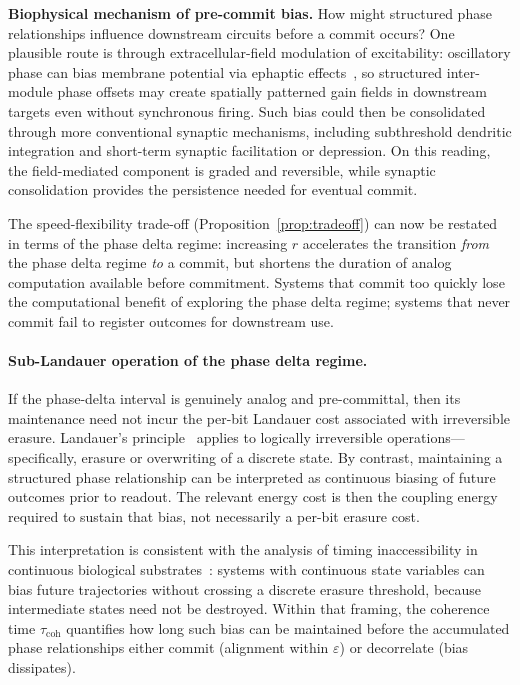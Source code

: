 \documentclass[12pt]{article}
\begin{document}
\noindent\textbf{Biophysical mechanism of pre-commit bias.} How might structured phase relationships influence downstream circuits before a commit occurs? One plausible route is through extracellular-field modulation of excitability: oscillatory phase can bias membrane potential via ephaptic effects~\cite{anastassiou2011,fries2005}, so structured inter-module phase offsets may create spatially patterned gain fields in downstream targets even without synchronous firing. Such bias could then be consolidated through more conventional synaptic mechanisms, including subthreshold dendritic integration and short-term synaptic facilitation or depression. On this reading, the field-mediated component is graded and reversible, while synaptic consolidation provides the persistence needed for eventual commit.

The speed-flexibility trade-off (Proposition~\ref{prop:tradeoff}) can now be restated in terms of the phase delta regime: increasing $r$ accelerates the transition \emph{from} the phase delta regime \emph{to} a commit, but shortens the duration of analog computation available before commitment. Systems that commit too quickly lose the computational benefit of exploring the phase delta regime; systems that never commit fail to register outcomes for downstream use.

\paragraph{Sub-Landauer operation of the phase delta regime.} If the phase-delta interval is genuinely analog and pre-committal, then its maintenance need not incur the per-bit Landauer cost associated with irreversible erasure. Landauer's principle~\cite{landauer1961} applies to logically irreversible operations---specifically, erasure or overwriting of a discrete state. By contrast, maintaining a structured phase relationship can be interpreted as continuous biasing of future outcomes prior to readout. The relevant energy cost is then the coupling energy required to sustain that bias, not necessarily a per-bit erasure cost.

This interpretation is consistent with the analysis of timing inaccessibility in continuous biological substrates~\cite{todd2025demon}: systems with continuous state variables can bias future trajectories without crossing a discrete erasure threshold, because intermediate states need not be destroyed. Within that framing, the coherence time $\tau_{\mathrm{coh}}$ quantifies how long such bias can be maintained before the accumulated phase relationships either commit (alignment within $\varepsilon$) or decorrelate (bias dissipates).
\end{document}
